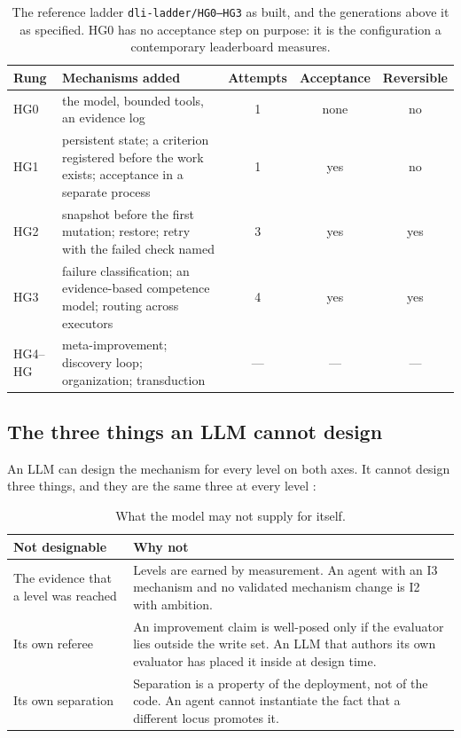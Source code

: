 \begin{table}[H]
\centering\small
\begin{tabularx}{\textwidth}{@{}lYccc@{}}
\toprule
Rung & Mechanisms added & Attempts & Acceptance & Reversible \\
\midrule
HG0 & the model, bounded tools, an evidence log & 1 & none & no \\
HG1 & persistent state; a criterion registered before the work exists; acceptance in a separate process & 1 & yes & no \\
HG2 & snapshot before the first mutation; restore; retry with the failed check named & 3 & yes & yes \\
HG3 & failure classification; an evidence-based competence model; routing across executors & 4 & yes & yes \\
HG4--HG\Om{} & meta-improvement; discovery loop; organization; transduction & --- & --- & --- \\
\bottomrule
\end{tabularx}
\caption{The reference ladder \texttt{dli-ladder/HG0--HG3} as built, and the generations above it as specified. HG0 has no acceptance step on purpose: it is the configuration a contemporary leaderboard measures.}
\label{tab:ladder}
\end{table}

\subsection{The three things an LLM cannot design}\label{sec:three}

An LLM can design the mechanism for every level on both axes. It cannot design three things, and they are the same three at every level \citep{yang2026designing}:

\begin{table}[H]
\centering\small
\begin{tabularx}{\textwidth}{@{}lY@{}}
\toprule
Not designable & Why not \\
\midrule
The evidence that a level was reached & Levels are earned by measurement. An agent with an I3 mechanism and no validated mechanism change is I2 with ambition. \\
Its own referee & An improvement claim is well-posed only if the evaluator lies outside the write set. An LLM that authors its own evaluator has placed it inside at design time. \\
Its own separation & Separation is a property of the deployment, not of the code. An agent cannot instantiate the fact that a different locus promotes it. \\
\bottomrule
\end{tabularx}
\caption{What the model may not supply for itself.}
\label{tab:three}
\end{table}

